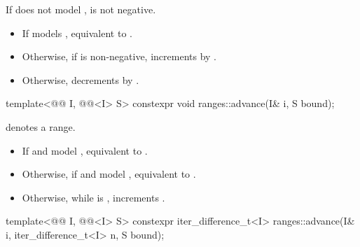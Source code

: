 \begin{itemdescr}
\pnum
\expects
If  does not model ,
 is not negative.

\pnum
\effects
\begin{itemize}
\item If  models ,
  equivalent to .
\item Otherwise, if  is non-negative, increments
   by .
\item Otherwise, decrements  by .
\end{itemize}
\end{itemdescr}

%
\begin{itemdecl}
template<@@ I, @@<I> S>
  constexpr void ranges::advance(I& i, S bound);
\end{itemdecl}

\begin{itemdescr}
\pnum
\expects
{} denotes a range.

\pnum
\effects
\begin{itemize}
\item If  and  model ,
  equivalent to .
\item Otherwise, if  and  model ,
  equivalent to .
\item Otherwise, while  is ,
  increments .
\end{itemize}
\end{itemdescr}

%
\begin{itemdecl}
template<@@ I, @@<I> S>
  constexpr iter_difference_t<I> ranges::advance(I& i, iter_difference_t<I> n, S bound);
\end{itemdecl}

